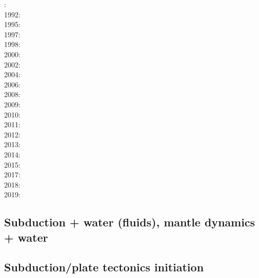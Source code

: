 {\scriptsize
{}: \cite{futo85}\\
1992: \cite{wosp92}\\
1995: \cite{yowo95}\cite{voda95}\cite{davo95}\\
1997: \cite{wowo97}\\
1998: \cite{desw98}\cite{caws98}\\
2000: \cite{wosp00}\\
2002: \cite{bugw02}\\
2004: \cite{geym04}\\
2006: \cite{fabm06}\\
2008: \cite{zlfd08}\\
2009: \cite{anbi09}\cite{bubi09}\cite{vasv09}\\
2010: \cite{bubi10}\cite{bagc10}\cite{hagr10}\\
2011: \cite{dugm11}\cite{vaal11}\cite{schm11}\\
2012: \cite{dugk12}\cite{dusg12}\\
2013: \cite{care13}\cite{mafv13}\cite{ghbu13}\cite{duge13}\cite{lixg13}\\
2014: \cite{dugs14}\cite{besr14}\cite{vosd14}\cite{butm14}\\
2015: \cite{vosc15}\cite{fohk15}\\
2017: \cite{frbm17}\cite{maav17}\\
2018: \cite{garm18}\cite{bezb18}\\
2019: \cite{beml19}\cite{fegb19}
}

\subsection{Subduction + water (fluids), mantle dynamics + water}

{\scriptsize
\noindent
\cite{vakp02}
\cite{roms10}
\cite{geme11}\cite{vahs11}
\cite{fagm12}
\cite{qubu14}\cite{mabv14}\cite{malg14}\cite{wisv14}
\cite{bomv15}\cite{nani15}
\cite{ceww17}\cite{wewv17}
\cite{ceww19}\cite{meag19}\cite{ligc19}
}

\subsection{Subduction/plate tectonics initiation}

